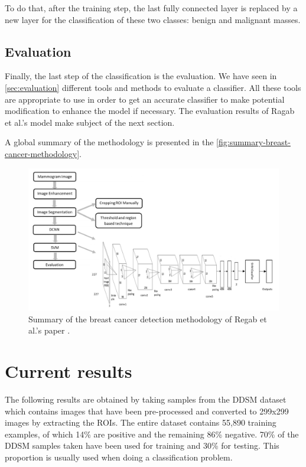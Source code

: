 \documentclass[11pt, openany]{report}
\theoremstyle{plain}
\theoremstyle{definition}
\theoremstyle{remark}
\begin{document}
To do that, after the training step, the last fully connected layer is replaced by a new layer for the classification of these two classes: benign and malignant masses.

\subsection{Evaluation}
Finally, the last step of the classification is the evaluation. We have seen in \autoref{sec:evaluation} different tools and methods to evaluate a classifier. All these tools are appropriate to use in order to get an accurate classifier to make potential modification to enhance the model if necessary. The evaluation results of Ragab et al.'s model make subject of the next section. 

A global summary of the methodology is presented in the \autoref{fig:summary-breast-cancer-methodology}.

\newpage
\hspace*{0mm}\vfill
\begin{figure}[h]
  \centering
  \includegraphics[scale=0.375]{figures/summary-breast-cancer-methodology.png}
  \caption{Summary of the breast cancer detection methodology of Regab et al.'s paper \cite{breast-cancer}.}
  \label{fig:summary-breast-cancer-methodology}
\end{figure}
\vfill\hspace*{0mm}

\newpage
\section{Current results}
The following results are obtained by taking samples from the DDSM dataset which contains images that have been pre-processed and converted to 299x299 images by extracting the ROIs. The entire dataset contains 55,890 training examples, of which 14\% are positive and the remaining 86\% negative. 70\% of the DDSM samples taken have been used for training and 30\% for testing. This proportion is usually used when doing a classification problem. 
\end{document}
